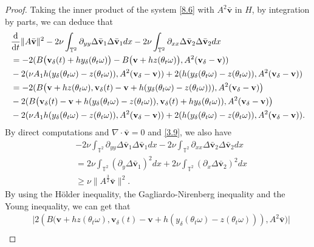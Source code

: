 \documentclass{elsarticle}
\theoremstyle{definition}
\numberwithin{equation}{section}
\renewcommand{\d}{{\rm{d}}}
\begin{document}
\begin{proof} Taking the inner product of the system   \eqref{8.6} with $A^2\bar{\textbf{v}}$ in $H$,  by integration by parts, we can deduce that
\begin{align}\label{8.18}
&\frac{\d}{\d t}\|A\bar{\textbf{v}}\|^2-2\nu \int_{\mathbb{T}^2}\partial_{yy}\Delta \bar{\textbf{v}}_1\Delta\bar{\textbf{v}}_1dx-2\nu \int_{\mathbb{T}^2}\partial_{xx}\Delta \bar{\textbf{v}}_2\Delta \bar{\textbf{v}}_2dx\nonumber\\
&=-2(B\big( \textbf{v}_\delta(t)+hy_\delta(\theta_t\omega)\big)-B\big( \textbf{v}+hz(\theta_t\omega)\big),A^2(\textbf{v}_\delta-\textbf{v}))\nonumber\\
&-  2(\nu A_1h(y_\delta(\theta_t\omega)-z(\theta_t\omega)),A^2(\textbf{v}_\delta-\textbf{v}))
+2(h(y_\delta (\theta_t\omega)-z(\theta_t\omega)),A^2(\textbf{v}_\delta-\textbf{v}))\nonumber\\
&=-2(B\big(\textbf{v}+hz(\theta_t\omega),\textbf{v}_\delta(t)-\textbf{v}+h(y_\delta(\theta_t\omega)-z(\theta_t\omega)))
,A^2(\textbf{v}_\delta-\textbf{v})\big)\nonumber\\
&-2(B\big( \textbf{v}_\delta(t)-\textbf{v}+h(y_\delta(\theta_t\omega)-z(\theta_t\omega)),\textbf{v}_\delta(t)+hy_\delta(\theta_t\omega))
,A^2(\textbf{v}_\delta-\textbf{v})\big)\nonumber\\
&-  2(\nu A_1h(y_\delta(\theta_t\omega)-z(\theta_t\omega)),A^2(\textbf{v}_\delta-\textbf{v}))
+2(h(y_\delta (\theta_t\omega)-z(\theta_t\omega)),A^2(\textbf{v}_\delta-\textbf{v})).
\end{align}
By direct computations and $\nabla\cdot \bar{\textbf{v}}=0$ and \eqref{3.9}, we also have
\begin{align}\label{9.1}
&-2\nu \int_{\mathbb{T}^2}\partial_{yy}\Delta \bar{\textbf{v}}_1\Delta\bar{\textbf{v}}_1dx-2\nu \int_{\mathbb{T}^2}\partial_{xx}\Delta \bar{\textbf{v}}_2\Delta \bar{\textbf{v}}_2dx\nonumber\\
&= 2\nu \int_{\mathbb{T}^2}(\partial_{y}\Delta \bar{\textbf{v}}_1)^2dx
+2\nu \int_{\mathbb{T}^2}(\partial_{x}\Delta \bar{\textbf{v}}_2)^2dx
\nonumber\\
&\geq\nu\|A^{\frac32} \bar{\textbf{v}}\|^2.
\end{align}
By using the H\"{o}lder inequality, the Gagliardo-Nirenberg inequality and the Young inequality, we can get that
\begin{align}\label{9.2}
 &\big| 2(B\big(\textbf{v}+hz(\theta_t\omega),\textbf{v}_\delta(t)-\textbf{v}+h(y_\delta(\theta_t\omega)-z(\theta_t\omega)))
,A^2\bar{\textbf{v}}\big)\big|\nonumber\\

\end{align}
\end{proof}
\end{document}
